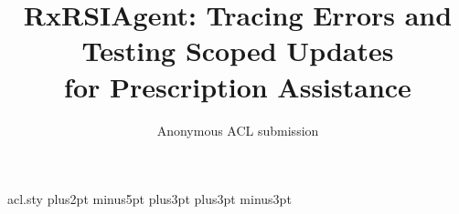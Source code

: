 \begin{filecontents*}[overwrite]{acl.sty}
\abovedisplayskip 7pt plus2pt minus5pt%
\belowdisplayskip \abovedisplayskip
\abovedisplayshortskip  0pt plus3pt%
\belowdisplayshortskip  4pt plus3pt minus3pt%

\def\@normalsize{\@setsize\normalsize{11pt}\xpt\@xpt}
\def\small{\@setsize\small{10pt}\ixpt\@ixpt}
\def\footnotesize{\@setsize\footnotesize{10pt}\ixpt\@ixpt}
\def\scriptsize{\@setsize\scriptsize{8pt}\viipt\@viipt}
\def\tiny{\@setsize\tiny{7pt}\vipt\@vipt}
\def\large{\@setsize\large{14pt}\xiipt\@xiipt}
\def\Large{\@setsize\Large{16pt}\xivpt\@xivpt}
\def\LARGE{\@setsize\LARGE{20pt}\xviipt\@xviipt}
\def\huge{\@setsize\huge{23pt}\xxpt\@xxpt}
\def\Huge{\@setsize\Huge{28pt}\xxvpt\@xxvpt}

\ifacl@hyperref
  \RequirePackage{hyperref}
  \hypersetup{colorlinks=true, citecolor=darkblue, linkcolor=darkblue, urlcolor=darkblue}
\else
  \def\href#1#2{{#2}}
  \usepackage{url}
\fi

\end{filecontents*}

\documentclass[11pt]{article}
\usepackage[review]{acl}
\usepackage{times,latexsym}
\usepackage[T1]{fontenc}
\usepackage[utf8]{inputenc}
\usepackage{microtype,booktabs,tabularx,amsmath,amssymb,graphicx,tikz}
\usetikzlibrary{arrows.meta,positioning}
\title{RxRSIAgent: Tracing Errors and Testing Scoped Updates\\for Prescription Assistance}
\author{Anonymous ACL submission}

